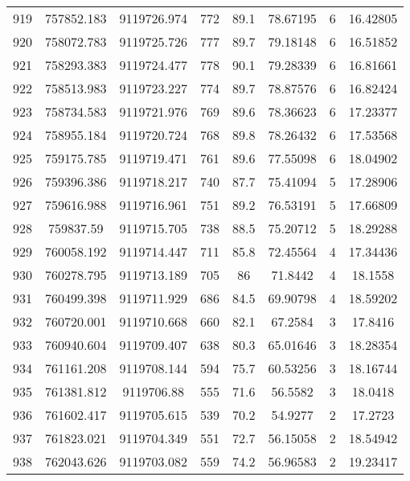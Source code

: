 \begin{longtable}{cccccccc}
919  & 757852.183      & 9119726.974      & 772     & 89.1  & 78.67195 & 6  & 16.42805 \\
920  & 758072.783      & 9119725.726      & 777     & 89.7  & 79.18148 & 6  & 16.51852 \\
921  & 758293.383      & 9119724.477      & 778     & 90.1  & 79.28339 & 6  & 16.81661 \\
922  & 758513.983      & 9119723.227      & 774     & 89.7  & 78.87576 & 6  & 16.82424 \\
923  & 758734.583      & 9119721.976      & 769     & 89.6  & 78.36623 & 6  & 17.23377 \\
924  & 758955.184      & 9119720.724      & 768     & 89.8  & 78.26432 & 6  & 17.53568 \\
925  & 759175.785      & 9119719.471      & 761     & 89.6  & 77.55098 & 6  & 18.04902 \\
926  & 759396.386      & 9119718.217      & 740     & 87.7  & 75.41094 & 5  & 17.28906 \\
927  & 759616.988      & 9119716.961      & 751     & 89.2  & 76.53191 & 5  & 17.66809 \\
928  & 759837.59       & 9119715.705      & 738     & 88.5  & 75.20712 & 5  & 18.29288 \\
929  & 760058.192      & 9119714.447      & 711     & 85.8  & 72.45564 & 4  & 17.34436 \\
930  & 760278.795      & 9119713.189      & 705     & 86    & 71.8442  & 4  & 18.1558  \\
931  & 760499.398      & 9119711.929      & 686     & 84.5  & 69.90798 & 4  & 18.59202 \\
932  & 760720.001      & 9119710.668      & 660     & 82.1  & 67.2584  & 3  & 17.8416  \\
933  & 760940.604      & 9119709.407      & 638     & 80.3  & 65.01646 & 3  & 18.28354 \\
934  & 761161.208      & 9119708.144      & 594     & 75.7  & 60.53256 & 3  & 18.16744 \\
935  & 761381.812      & 9119706.88       & 555     & 71.6  & 56.5582  & 3  & 18.0418  \\
936  & 761602.417      & 9119705.615      & 539     & 70.2  & 54.9277  & 2  & 17.2723  \\
937  & 761823.021      & 9119704.349      & 551     & 72.7  & 56.15058 & 2  & 18.54942 \\
938  & 762043.626      & 9119703.082      & 559     & 74.2  & 56.96583 & 2  & 19.23417 \\

\end{longtable}
